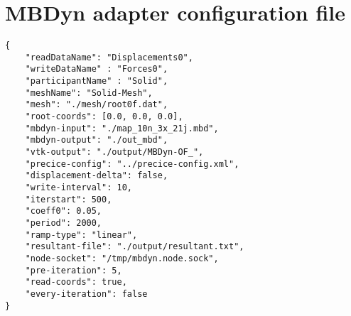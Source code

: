 \chapter{MBDyn adapter configuration file}
\label{app:mbd-config-file}

\lstset{language=json}
\begin{lstlisting}[caption=MBDyn adapter configuration file example, label=adapter-config]
{
	"readDataName": "Displacements0",
	"writeDataName" : "Forces0",
	"participantName" : "Solid",
	"meshName": "Solid-Mesh",
	"mesh": "./mesh/root0f.dat",
	"root-coords": [0.0, 0.0, 0.0],
	"mbdyn-input": "./map_10n_3x_21j.mbd",
	"mbdyn-output": "./out_mbd",
	"vtk-output": "./output/MBDyn-OF_",
	"precice-config": "../precice-config.xml",
	"displacement-delta": false,
	"write-interval": 10,
	"iterstart": 500,
	"coeff0": 0.05,
	"period": 2000,
	"ramp-type": "linear",
	"resultant-file": "./output/resultant.txt",
	"node-socket": "/tmp/mbdyn.node.sock",
	"pre-iteration": 5,
	"read-coords": true,
	"every-iteration": false
}
\end{lstlisting}